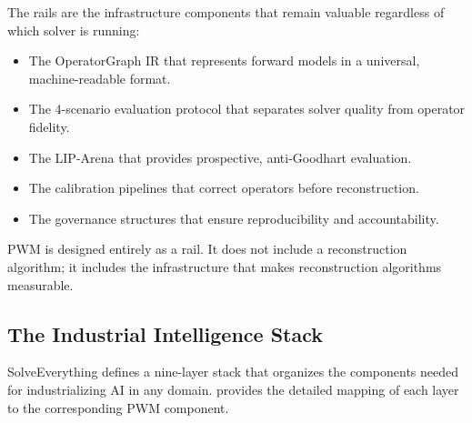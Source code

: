The rails are the infrastructure components that remain valuable
regardless of which solver is running:
\begin{itemize}
  \item The OperatorGraph IR that represents forward models in a
        universal, machine-readable format.
  \item The 4-scenario evaluation protocol that separates solver quality
        from operator fidelity.
  \item The LIP-Arena that provides prospective, anti-Goodhart
        evaluation.
  \item The calibration pipelines that correct operators before
        reconstruction.
  \item The governance structures that ensure reproducibility and
        accountability.
\end{itemize}

PWM is designed entirely as a rail.
It does not include a reconstruction algorithm; it includes the
infrastructure that makes reconstruction algorithms measurable.


\subsection{The Industrial Intelligence Stack}
\label{sec:stack}

SolveEverything defines a nine-layer stack that organizes the
components needed for industrializing AI in any domain.
provides the detailed mapping of each layer to the corresponding PWM component.

